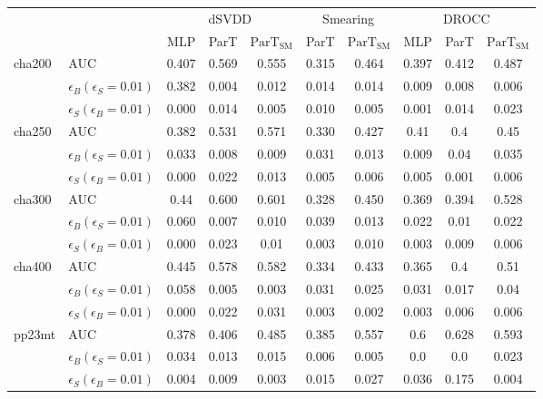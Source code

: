 \begin{table}[H]
    \centering
    \setlength{\tabcolsep}{4pt}
    \begin{tabular}{ll|ccc|cc|ccc}
    \hline
    \multicolumn{2}{c|}{} & \multicolumn{3}{c|}{dSVDD} & \multicolumn{2}{c|}{Smearing} & \multicolumn{3}{c}{DROCC}  \\
     & & MLP & ParT & $\text{ParT}_{\text{SM}}$ & ParT & $\text{ParT}_{\text{SM}}$ & MLP & ParT & $\text{ParT}_{\text{SM}}$ \\
    \hline \hline
    \multirow{3}{*}{cha200} & AUC    & 0.407 & 0.569 & 0.555 & 0.315 & 0.464 & 0.397 & 0.412 & 0.487 \\
    & $\epsilon_B(\epsilon_S=0.01)$  & 0.382 & 0.004 & 0.012 & 0.014 & 0.014 & 0.009 & 0.008 & 0.006 \\
    & $\epsilon_S(\epsilon_B=0.01)$  & 0.000 & 0.014 & 0.005 & 0.010 & 0.005 & 0.001 & 0.014 & 0.023 \\
    \hline
    \multirow{3}{*}{cha250} & AUC    & 0.382 & 0.531 & 0.571 & 0.330 & 0.427 & 0.41 & 0.4 & 0.45 \\
    & $\epsilon_B(\epsilon_S=0.01)$  & 0.033 & 0.008 & 0.009 & 0.031 & 0.013 & 0.009 & 0.04 & 0.035 \\
    & $\epsilon_S(\epsilon_B=0.01)$  & 0.000 & 0.022 & 0.013 & 0.005 & 0.006 & 0.005 & 0.001 & 0.006 \\
    \hline
    \multirow{3}{*}{cha300} & AUC    & 0.44 & 0.600 & 0.601 & 0.328 & 0.450 & 0.369 & 0.394 & 0.528 \\
    & $\epsilon_B(\epsilon_S=0.01)$  & 0.060 & 0.007 & 0.010 & 0.039 & 0.013 & 0.022 & 0.01 & 0.022 \\
    & $\epsilon_S(\epsilon_B=0.01)$  & 0.000 & 0.023 & 0.01 & 0.003 & 0.010 & 0.003 & 0.009 & 0.006 \\
    \hline
    \multirow{3}{*}{cha400} & AUC    & 0.445 & 0.578 & 0.582 & 0.334 & 0.433 & 0.365 & 0.4 & 0.51 \\
    & $\epsilon_B(\epsilon_S=0.01)$  & 0.058 & 0.005 & 0.003 & 0.031 & 0.025 & 0.031 & 0.017 & 0.04 \\
    & $\epsilon_S(\epsilon_B=0.01)$  & 0.000 & 0.022 & 0.031 & 0.003 & 0.002 & 0.003 & 0.006 & 0.006 \\
    \hline
    \multirow{3}{*}{pp23mt} & AUC    & 0.378 & 0.406 & 0.485 & 0.385 & 0.557 & 0.6 & 0.628 & 0.593 \\
    & $\epsilon_B(\epsilon_S=0.01)$  & 0.034 & 0.013 & 0.015 & 0.006 & 0.005 & 0.0 & 0.0 & 0.023 \\
    & $\epsilon_S(\epsilon_B=0.01)$  & 0.004 & 0.009 & 0.003 & 0.015 & 0.027 & 0.036 & 0.175 & 0.004 \\

\end{tabular}
\end{table}
